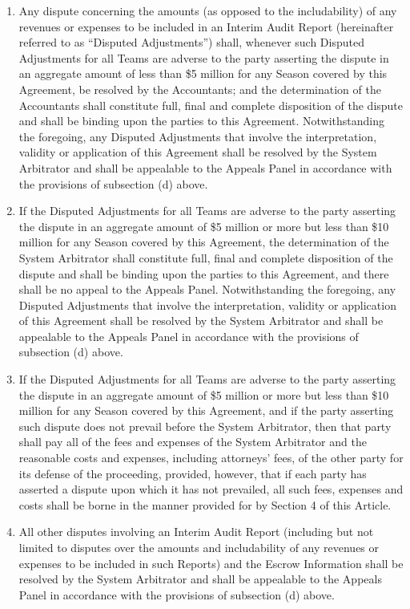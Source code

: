 \documentclass[
]{book}
\begin{document}
\begin{enumerate}
\item
  Any dispute concerning the amounts (as opposed to the includability) of any revenues or expenses to be included in an Interim Audit Report (hereinafter referred to as ``Disputed Adjustments'') shall, whenever such Disputed Adjustments for all Teams are adverse to the party asserting the dispute in an aggregate amount of less than \$5 million for any Season covered by this Agreement, be resolved by the Accountants; and the determination of the Accountants shall constitute full, final and complete disposition of the dispute and shall be binding upon the parties to this Agreement. Notwithstanding the foregoing, any Disputed Adjustments that involve the interpretation, validity or application of this Agreement shall be resolved by the System Arbitrator and shall be appealable to the Appeals Panel in accordance with the provisions of subsection (d) above.
\item
  If the Disputed Adjustments for all Teams are adverse to the party asserting the dispute in an aggregate amount of \$5 million or more but less than \$10 million for any Season covered by this Agreement, the determination of the System Arbitrator shall constitute full, final and complete disposition of the dispute and shall be binding upon the parties to this Agreement, and there shall be no appeal to the Appeals Panel. Notwithstanding the foregoing, any Disputed Adjustments that involve the interpretation, validity or application of this Agreement shall be resolved by the System Arbitrator and shall be appealable to the Appeals Panel in accordance with the provisions of subsection (d) above.
\item
  If the Disputed Adjustments for all Teams are adverse to the party asserting the dispute in an aggregate amount of \$5 million or more but less than \$10 million for any Season covered by this Agreement, and if the party asserting such dispute does not prevail before the System Arbitrator, then that party shall pay all of the fees and expenses of the System Arbitrator and the reasonable costs and expenses, including attorneys' fees, of the other party for its defense of the proceeding, provided, however, that if each party has asserted a dispute upon which it has not prevailed, all such fees, expenses and costs shall be borne in the manner provided for by Section 4 of this Article.
\item
  All other disputes involving an Interim Audit Report (including but not limited to disputes over the amounts and includability of any revenues or expenses to be included in such Reports) and the Escrow Information shall be resolved by the System Arbitrator and shall be appealable to the Appeals Panel in accordance with the provisions of subsection (d) above.
\end{enumerate}
\end{document}
